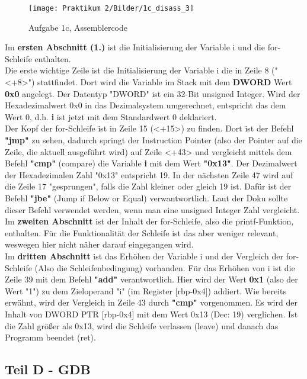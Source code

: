 \documentclass[12pt]{article}
\begin{document}
\begin{figure}[htbp]
    \centering
    \texttt{[image: Praktikum 2/Bilder/1c\_disass\_3]}
    \caption{Aufgabe 1c, Assemblercode}
\end{figure}

Im \textbf{ersten Abschnitt (1.)} ist die Initialisierung der Variable i und die for-Schleife enthalten.\\
Die erste wichtige Zeile ist die Initialisierung der Variable i die in Zeile 8 ("<+8>") stattfindet. Dort wird die Variable im Stack mit dem \textbf{DWORD} Wert \textbf{0x0} angelegt. Der Datentyp "DWORD" ist ein 32-Bit unsigned Integer. Wird der Hexadezimalwert 0x0 in das Dezimalsystem umgerechnet, entspricht das dem Wert 0, d.h. \textbf{i} ist jetzt mit dem Standardwert 0 deklariert.\\
Der Kopf der for-Schleife ist in Zeile 15 (<+15>) zu finden. Dort ist der Befehl \textbf{"jmp"} zu sehen, dadurch springt der Instruction Pointer (also der Pointer auf die Zeile, die aktuell ausgeführt wird) auf Zeile <+43> und vergleicht mittels dem Befehl \textbf{"cmp"} (compare) die Variable \textbf{i} mit dem Wert \textbf{"0x13"}. Der Dezimalwert der Hexadezimalen Zahl "0x13" entspricht 19. In der nächsten Zeile 47 wird auf die Zeile 17 "gesprungen", falls die Zahl kleiner oder gleich 19 ist. Dafür ist der Befehl \textbf{"jbe"} (Jump if Below or Equal) verwantwortlich. Laut der Doku sollte dieser Befehl verwendet werden, wenn man eine unsigned Integer Zahl vergleicht.\\
Im \textbf{zweiten Abschnitt} ist der Inhalt der for-Schleife, also die printf-Funktion, enthalten. Für die Funktionalität der Schleife ist das aber weniger relevant, weswegen hier nicht näher darauf eingegangen wird.\\
Im \textbf{dritten Abschnitt} ist das Erhöhen der Variable i und der Vergleich der for-Schleife (Also die Schleifenbedingung) vorhanden. Für das Erhöhen von i ist die Zeile 39 mit dem Befehl \textbf{"add"} verantwortlich. Hier wird der Wert \textbf{0x1} (also der Wert "1") zu dem Zieloperand "i" (im Register [rbp-0x4]) addiert.
Wie bereits erwähnt, wird der Vergleich in Zeile 43 durch \textbf{"cmp"} vorgenommen. Es wird der Inhalt von DWORD PTR [rbp-0x4] mit dem Wert 0x13 (Dec: 19) verglichen.
Ist die Zahl größer als 0x13, wird die Schleife verlassen (leave) und danach das Programm beendet (ret).\\



\subsection{Teil D - GDB}
\end{document}
